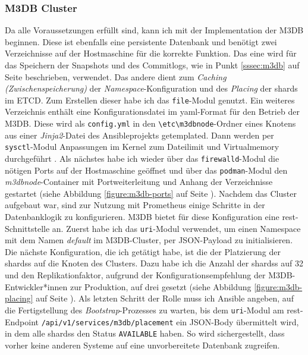 \documentclass[11pt,a4paper]{article}
\begin{document}
\subsubsection{M3DB Cluster}
Da alle Voraussetzungen erfüllt sind, kann ich mit der Implementation der M3DB beginnen.
Diese ist ebenfalls eine persistente Datenbank und benötigt zwei Verzeichnisse auf der Hostmaschine
für die korrekte Funktion. Das eine wird für das Speichern der Snapshots und des Commitlogs,
wie in Punkt \ref{sssec:m3db} auf Seite \pageref{sssec:m3db} beschrieben, verwendet. Das andere
dient zum \emph{Caching (Zwischenspeicherung)} der \emph{Namespace}-Konfiguration und des \emph{Placing}
der \gls{shards} im ETCD. Zum Erstellen dieser habe ich das \verb|file|-Modul genutzt.
Ein weiteres Verzeichnis enthält eine Konfigurationsdatei im \gls{yaml}-Format für den Betrieb der M3DB.
Diese wird als \verb|config.yml| in den \verb|\etc\m3dbnode|-Ordner eines Knotens aus einer \emph{Jinja2}-Datei
des Ansibleprojekts getemplated. Dann werden per \verb|sysctl|-Modul Anpassungen im Kernel zum
Dateilimit und Virtualmemory durchgeführt \cite{m3db}.
Als nächstes habe ich wieder über das \verb|firewalld|-Modul die nötigen Ports
auf der Hostmaschine geöffnet und über das \verb|podman|-Modul den \emph{m3dbnode}-Container
mit Portweiterleitung und Anhang der Verzeichnisse gestartet (siehe Abbildung \ref{figure:m3db-ports} auf Seite \pageref{figure:m3db-ports}).
Nachdem das Cluster aufgebaut war, sind zur Nutzung mit Prometheus einige Schritte in der
Datenbanklogik zu konfigurieren. M3DB bietet für diese Konfiguration eine \gls{rest}-Schnittstelle an.
Zuerst habe ich das \verb|uri|-Modul verwendet, um
einen  Namespace mit dem Namen \emph{default} im M3DB-Cluster,
per \gls{JSON}-Payload zu initialisieren. Die nächste Konfiguration, die ich getätigt
habe, ist die der Platzierung der \gls{shards}s auf die Knoten des Clusters. Dazu
habe ich die Anzahl der \gls{shards}s auf 32 und den Replikationfaktor, aufgrund
der Konfigurationsempfehlung der M3DB-Entwickler*innen zur Produktion, auf drei gesetzt
(siehe Abbildung \ref{figure:m3db-placing} auf Seite \pageref{figure:m3db-placing}).
Als letzten Schritt der Rolle muss ich Ansible angeben, auf die Fertigstellung des
\emph{Bootstrap}-Prozesses zu warten, bis dem \verb|uri|-Modul am
\gls{rest}-Endpoint \verb|/api/v1/services/m3db/placement| ein \gls{JSON}-Body übermittelt wird, in
dem alle \gls{shards}s den Status \verb|AVAILABLE| haben. So wird sichergestellt, dass
vorher keine anderen Systeme auf eine unvorbereitete Datenbank zugreifen.
\end{document}
